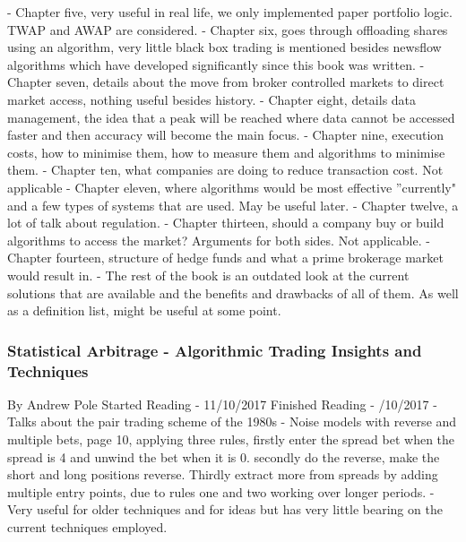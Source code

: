 \documentclass[12pt,a4paper]{article}
\begin{document}
- Chapter five, very useful in real life, we only implemented paper portfolio logic. TWAP and AWAP are considered. \newline
- Chapter six, goes through offloading shares using an algorithm, very little black box trading is mentioned besides newsflow algorithms which have developed significantly since this book was written. \newline
- Chapter seven, details about the move from broker controlled markets to direct market access, nothing useful besides history. \newline
- Chapter eight, details data management, the idea that a peak will be reached where data cannot be accessed faster and then accuracy will become the main focus. \newline
- Chapter nine, execution costs, how to minimise them, how to measure them and algorithms to minimise them. \newline
- Chapter ten, what companies are doing to reduce transaction cost. Not applicable \newline
- Chapter eleven, where algorithms would be most effective ''currently" and a few types of systems that are used. May be useful later. \newline
- Chapter twelve, a lot of talk about regulation. \newline
- Chapter thirteen, should a company buy or build algorithms to access the market? Arguments for both sides. Not applicable. \newline
- Chapter fourteen, structure of hedge funds and what a prime brokerage market would result in. \newline
- The rest of the book is an outdated look at the current solutions that are available and the benefits and drawbacks of all of them. As well as a definition list, might be useful at some point.

\subsubsection*{Statistical Arbitrage - Algorithmic Trading Insights and Techniques}
By Andrew Pole \newline
Started Reading - 11/10/2017 \newline
Finished Reading -  /10/2017 \newline
\newline
- Talks about the pair trading scheme of the 1980s
- Noise models with reverse and multiple bets, page 10, applying three rules, firstly enter the spread bet when the spread is 4 and unwind the bet when it is 0. secondly do the reverse, make the short and long positions reverse. Thirdly extract more from spreads by adding multiple entry points, due to rules one and two working over longer periods.
- Very useful for older techniques and for ideas but has very little bearing on the current techniques employed.
\end{document}
